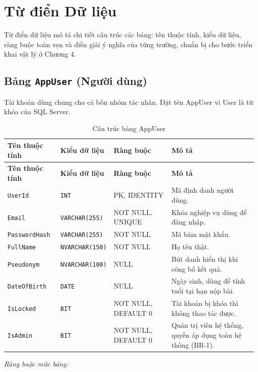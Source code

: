 \section{Từ điển Dữ liệu}

Từ điển dữ liệu mô tả chi tiết cấu trúc các bảng: tên thuộc tính, kiểu dữ liệu, ràng buộc toàn vẹn và diễn giải ý nghĩa của từng trường, chuẩn bị cho bước triển khai vật lý ở Chương 4.

\subsection{Bảng \texttt{AppUser} (Người dùng)}

Tài khoản dùng chung cho cả bốn nhóm tác nhân. Đặt tên AppUser vì User là từ khóa của SQL Server.

\begin{longtable}{|L{4cm}|L{3.15cm}|L{2.4cm}|L{4.55cm}|}
\caption{Cấu trúc bảng AppUser} \\
\hline
\textbf{Tên thuộc tính} & \textbf{Kiểu dữ liệu} & \textbf{Ràng buộc} & \textbf{Mô tả} \\ \hline
\endfirsthead
\hline
\textbf{Tên thuộc tính} & \textbf{Kiểu dữ liệu} & \textbf{Ràng buộc} & \textbf{Mô tả} \\ \hline
\endhead
\texttt{UserId} & \texttt{INT} & PK, IDENTITY & Mã định danh người dùng. \\ \hline
\texttt{Email} & \texttt{VARCHAR(255)} & NOT NULL, UNIQUE & Khóa nghiệp vụ dùng để đăng nhập. \\ \hline
\texttt{PasswordHash} & \texttt{VARCHAR(255)} & NOT NULL & Mã băm mật khẩu. \\ \hline
\texttt{FullName} & \texttt{NVARCHAR(150)} & NOT NULL & Họ tên thật. \\ \hline
\texttt{Pseudonym} & \texttt{NVARCHAR(100)} & NULL & Bút danh hiển thị khi công bố kết quả. \\ \hline
\texttt{DateOfBirth} & \texttt{DATE} & NULL & Ngày sinh, dùng để tính tuổi tại hạn nộp bài. \\ \hline
\texttt{IsLocked} & \texttt{BIT} & NOT NULL, DEFAULT 0 & Tài khoản bị khóa thì không thao tác được. \\ \hline
\texttt{IsAdmin} & \texttt{BIT} & NOT NULL, DEFAULT 0 & Quản trị viên hệ thống, quyền áp dụng toàn hệ thống (BR-1). \\ \hline
\end{longtable}

\noindent\textit{Ràng buộc mức bảng:}

